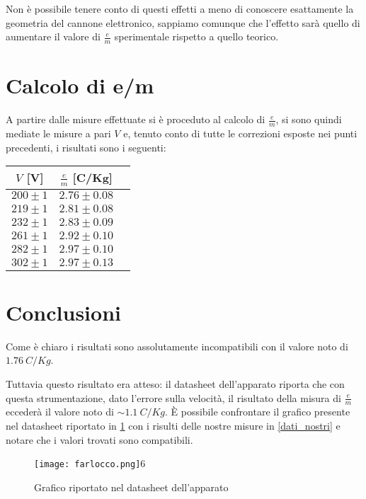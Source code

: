 Non è possibile tenere conto di questi effetti a meno di conoscere esattamente la geometria del cannone elettronico, sappiamo comunque che l'effetto sarà quello di aumentare il valore di  $\tfrac{e}{m}$ sperimentale rispetto a quello teorico.

\section{Calcolo di e/m}
A partire dalle misure effettuate si è proceduto al calcolo di $\tfrac{e}{m}$, si sono quindi mediate le misure a pari $V$ e, tenuto conto di tutte le correzioni esposte nei punti precedenti, i risultati sono i seguenti:

\begin{table}[H]
	\centering
	\begin{tabular}{ccc}
		\toprule
		$V$ [\si{\volt}] & 	$\frac{e}{m}$ [C/Kg] \\
		\midrule
$	200 \pm 1	$ & $	2.76 \pm 0.08	$ \\
$	219 \pm 1	$ & $	2.81 \pm 0.08	$ \\
$	232 \pm 1	$ & $	2.83 \pm 0.09	$ \\
$	261 \pm 1	$ & $	2.92 \pm 0.10	$ \\
$	282 \pm 1	$ & $	2.97 \pm 0.10	$ \\
$	302 \pm 1	$ & $	2.97 \pm 0.13	$ \\
\bottomrule
\end{tabular}
\end{table}

\section{Conclusioni}
Come è chiaro i risultati sono assolutamente incompatibili con il valore noto di $\SI{1.76}{C/Kg}$.

Tuttavia questo risultato era atteso: il datasheet dell'apparato riporta che con questa strumentazione, dato l'errore sulla velocità, il risultato della misura di $\tfrac{e}{m}$ eccederà il valore noto di $\sim \SI{1.1}{C/Kg}$.
È possibile confrontare il grafico presente nel datasheet riportato in \figurename{ \ref{grafico_farlocco}} con i risulti delle nostre misure in \figurename{ \ref{dati_nostri}} e notare che i valori trovati sono compatibili.

\begin{figure}[H]
	\centering
	\texttt{[image: farlocco.png]}6
	\caption{Grafico riportato nel datasheet dell'apparato}
	\label{grafico_farlocco}
\end{figure}

